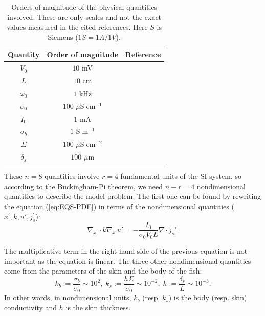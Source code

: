 \begin{table}[!h]
\centering%
\begin{tabular}{|c|c|c|}
\hline
Quantity  & Order of magnitude  & Reference\tabularnewline
\hline
\hline
$V_{0}$  & $10$ mV  & \cite{assad1998electric,stoddard1999electric}\tabularnewline
\hline
$L$  & $10$ cm  & \cite{moller1995electric}\tabularnewline
\hline
$\omega_{0}$  & $1$ kHz  & \cite{moller1995electric}\tabularnewline
\hline
$\sigma_{0}$  & $100$ $\mu$S$\cdot$cm$^{-1}$  & \cite{maciver2001prey}\tabularnewline
\hline
$I_{0}$  & $1$ mA  & \cite{bell1976electric}\tabularnewline
\hline
$\sigma_{b}$  & $1$ S$\cdot$m$^{-1}$  & \cite{scheich1973coding}\tabularnewline
\hline
$\Sigma$  & $100$ $\mu$S$\cdot$cm$^{-2}$  & \cite{caputi1998electric}\tabularnewline
\hline
$\delta_s$  & $100$ $\mu$m  & \cite{zakon1986electroreceptive}\tabularnewline
\hline
\end{tabular}

\caption{\label{tab:Orders-of-magnitude}Orders of magnitude of the
physical quantities involved. These are only scales and not the
exact values measured in the cited references. Here $S$ is Siemens
($1S =1A/1V$).}
\end{table}


These $n=8$ quantities involve $r=4$ fundamental units of the SI
system, so according to the Buckingham-Pi theorem, we need $n-r=4$
nondimensional quantities to describe the model problem. The first
one can be found by rewriting the equation (\ref{eq:EQS-PDE}) in
terms of the nondimensional quantities ($x^\prime, k, u',
j_{s}^\prime$):
\begin{equation}
\nabla_{x'}\cdot
k\nabla_{x'}u'=-\frac{I_{0}}{\sigma_{0}V_{0}L}\nabla\cdot
{j_{s}'}.\label{eq:nondimensionalized-EQS}
\end{equation}

The multiplicative term in the right-hand side of the previous
equation is not important as the equation is linear. The three
other nondimensional quantities come from the parameters of the
skin and the body of the fish:
\[
k_{b}:=\frac{\sigma_{b}}{\sigma_{0}}\sim10^{2},\; k_{s}:=\frac{h\Sigma}{\sigma_{0}}\sim10^{-2},\;h:=\frac{\delta_s}{L}\sim10^{-3}.
\]
 In other words, in nondimensional units, $k_{b}$ (resp. $k_{s}$)
is the body (resp. skin) conductivity and $h$ is the skin thickness.

